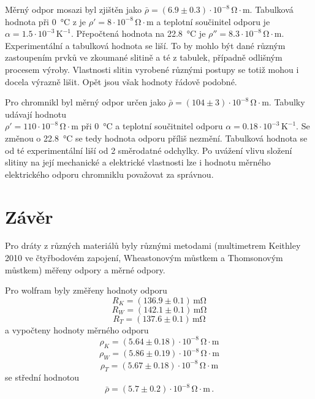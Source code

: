 \documentclass{../concepts/prepareprotokol} %
\begin{document}
Měrný odpor mosazi byl zjištěn jako $\bar{\rho} = (6.9 \pm 0.3) \cdot 10^{-8} \, \mathrm{\Omega \cdot m}$. Tabulková hodnota při \SI{0}{\celsius} z \cite{mikulcak} je $\rho' = 8 \cdot 10^{-8} \, \mathrm{\Omega \cdot m}$ a teplotní součinitel odporu je $\alpha = 1.5 \cdot 10^{-3} \, \mathrm{K^{-1}}$. Přepočtená hodnota na \SI{22.8}{\celsius} je $\rho'' = 8.3 \cdot 10^{-8} \, \mathrm{\Omega \cdot m}$. Experimentální a tabulková hodnota se liší. To by mohlo být dané různým zastoupením prvků ve zkoumané slitině a té z tabulek, případně odlišným procesem výroby. Vlastnosti slitin vyrobené různými postupy se totiž mohou i docela výrazně lišit. Opět jsou však hodnoty řádově podobné.

Pro chromnikl byl měrný odpor určen jako $\bar{\rho} = (104 \pm 3) \cdot 10^{-8} \, \mathrm{\Omega \cdot m}$. Tabulky \cite{mikulcak} udávají hodnotu \\ $\rho' = 110 \cdot 10^{-8} \, \mathrm{\Omega \cdot m}$ při \SI{0}{\celsius} a teplotní součitnitel odporu $\alpha = 0.18 \cdot 10^{-3} \, \mathrm{K^{-1}}$. Se změnou o \SI{22.8}{\celsius} se tedy hodnota odporu příliš nezmění. Tabulková hodnota se od té experimentální liší od 2 směrodatné odchylky. Po uvážení vlivu složení slitiny na její mechanické a elektrické vlastnosti lze i hodnotu měrného elektrického odporu chromniklu považovat za správnou.


\section{Závěr}

Pro dráty z různých materiálů byly různými metodami (multimetrem Keithley 2010 ve čtyřbodovém zapojení, Wheastonovým můstkem a Thomsonovým můstkem) měřeny odpory a měrné odpory.

Pro wolfram byly změřeny hodnoty odporu
\begin{equation*}
    R_K = (136.9 \pm 0.1) \, \si{\milli\ohm}
\end{equation*}
\begin{equation*}
    R_W = (142.1 \pm 0.1) \, \si{\milli\ohm}
\end{equation*}
\begin{equation*}
    R_T = (137.6 \pm 0.1) \, \si{\milli\ohm}
\end{equation*}
a vypočteny hodnoty měrného odporu
\begin{equation*}
    \rho_K = (5.64 \pm 0.18) \cdot 10^{-8} \, \mathrm{\Omega \cdot m}
\end{equation*}
\begin{equation*}
    \rho_W = (5.86 \pm 0.19) \cdot 10^{-8} \, \mathrm{\Omega \cdot m}
\end{equation*}
\begin{equation*}
    \rho_T = (5.67 \pm 0.18) \cdot 10^{-8} \, \mathrm{\Omega \cdot m}
\end{equation*}
se střední hodnotou
\begin{equation*}
    \bar{\rho} = (5.7 \pm 0.2) \cdot 10^{-8} \, \mathrm{\Omega \cdot m} \, .
\end{equation*}
\end{document}

